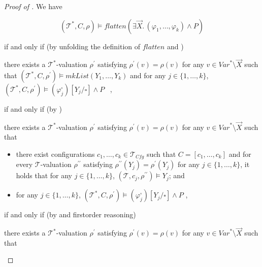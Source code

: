 \begin{proof}[Proof of ]
    We have
    \begin{proofenv}
        \begin{equation*}
            (\mathcal{T}^*, C, \rho) \vDash \mathit{flatten}(\exists \vec{X}.\, (\varphi_1,\ldots,\varphi_k) \land P)
        \end{equation*}
    \end{proofenv}
    if and only if (by unfolding the definition of $\mathit{flatten}$ and )
    \begin{proofenv}
        there exists a $\mathcal{T}^*$-valuation $\rho^\prime$ satisfying $\rho^\prime(v) = \rho(v)$
        for any $v \in \mathit{Var}^* \setminus \vec{X}$ such that
        $(\mathcal{T}^*, C, \rho^\prime) \vDash \mathit{mkList}(Y_1,\ldots,Y_k)$
        and for any $j \in \{ 1, \ldots, k \}$,
        $(\mathcal{T}^*, C, \rho^\prime) \vDash (\varphi_j^{\square})[Y_j/\square] \land P$ \, ,
    \end{proofenv}
    if and only if (by )
    \begin{proofenv}
        there exists a $\mathcal{T}^*$-valuation $\rho^\prime$ satisfying $\rho^\prime(v) = \rho(v)$
        for any $v \in \mathit{Var}^* \setminus \vec{X}$ such that
        \begin{itemize}
            \item there exist configurations $c_1, \ldots, c_k \in \mathcal{T}_{\mathit{Cfg}}$ such that
                    $C = [c_1, \ldots, c_k]$
                    and for every $\mathcal{T}$-valuation $\rho^{\prime\prime}$
                    satisfying $\rho^{\prime\prime}(Y_j) = \rho^\prime(Y_j)$ for any $j \in \{ 1, \ldots, k \}$,
                    it holds that for any $j \in \{ 1, \ldots, k \}$,
                    $(\mathcal{T}, c_j, \rho^{\prime\prime}) \vDash Y_j$; and
            \item for any $j \in \{ 1, \ldots, k \}$,
                    $(\mathcal{T}^*, C, \rho^\prime) \vDash (\varphi_j^{\square})[Y_j/\square] \land P$ ,
        \end{itemize}
    \end{proofenv}
    if and only if (by  and firstorder reasoning)
    \begin{proofenv}
        there exists a $\mathcal{T}^*$-valuation $\rho^\prime$ satisfying $\rho^\prime(v) = \rho(v)$
        for any $v \in \mathit{Var}^* \setminus \vec{X}$ such that
        \begin{itemize}

\end{itemize}
\end{proofenv}
\end{proof}
